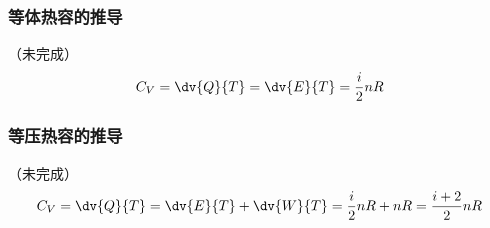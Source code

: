 \subsubsection{等体热容的推导}
（未完成）
\begin{equation}
C_V = \dv{Q}{T} = \dv{E}{T} = \frac{i}{2} nR
\end{equation}

\subsubsection{等压热容的推导}
（未完成）
\begin{equation}
C_V = \dv{Q}{T} = \dv{E}{T} + \dv{W}{T} = \frac{i}{2} nR + nR = \frac{i+2}{2} nR
\end{equation}

